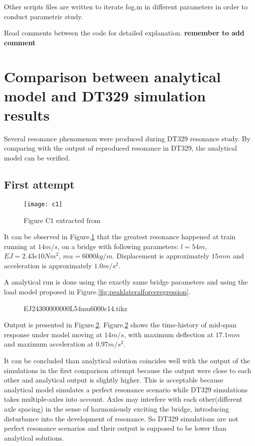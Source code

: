 Other scripts files are written to iterate fog.m in different parameters in order to conduct parametric study.

Read comments between the code for detailed explanation.
\textbf{remember to add comment}

\section{Comparison between analytical model and DT329 simulation results}


Several resonance phenomenon were produced during DT329 resonance study. By comparing with the output of reproduced resonance in DT329, the analytical model can be verified.

\subsection{First attempt}

\begin{figure}[h!]
    \centering
    \texttt{[image: c1]}
    \caption{Figure C1 extracted from \cite{d181dt329} }
    \label{fig:c1}
\end{figure}

It can be observed in Figure.\ref{fig:c1} that the greatest resonance happened at train running at $14m/s$, on a bridge with following parameters: $l=54m$, $EJ=2.43e10Nm^2$, $mu=6000kg/m$. Displacement is approximately $15mm$ and acceleration is approximately $1.0m/s^2$.

A analytical run is done using the exactly same bridge parameters and using the load model proposed in Figure.\ref{fig:peaklateralforceregression}. 

\begin{figure}[h!]
\centering 
\newlength\figureheight 
\newlength\figurewidth 
\setlength\figureheight{6cm} 
\setlength\figurewidth{6cm} 
 
\caption{EJ24300000000L54mu6000c14.tikz} 
\label{fig:EJ24300000000L54mu6000c14} 
\end{figure}

Output is presented in Figure.\ref{fig:EJ24300000000L54mu6000c14}. Figure.\ref{fig:EJ24300000000L54mu6000c14} shows the time-history of mid-span response under model moving at $14m/s$, with maximum deflection at $17.1mm$ and maximum acceleration at $0.97 m/s^2$.

It can be concluded than analytical solution coincides well with the output of the simulations in the first comparison attempt because the output were close to each other and analytical output is slightly higher. This is acceptable because analytical model simulates a perfect resonance scenario while DT329 simulations takes multiple-axles into account. Axles may interfere with each other(different axle spacing) in the sense of harmoniously exciting the bridge, introducing disturbance into the development of resonance. So DT329 simulations are not perfect resonance scenarios and their output is supposed to be lower than analytical solutions.

